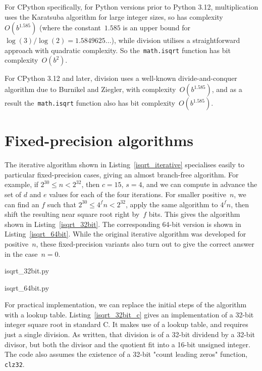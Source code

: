 \documentclass[a4paper]{article}
\theoremstyle{plain}
\theoremstyle{definition}
\begin{document}
For CPython specifically, for Python versions prior to Python 3.12,
multiplication uses the Karatsuba algorithm for large integer sizes, so has
complexity~$O(b^{1.585})$ (where the constant~$1.585$ is an upper bound
for~$\log(3)/\log(2) = 1.5849625...$), while division utilises a
straightforward approach with quadratic complexity. So
the~\lstinline$math.isqrt$ function has bit complexity~$O(b^2)$.

For CPython 3.12 and later, division uses a well-known divide-and-conquer
algorithm due to Burnikel and Ziegler, with complexity~$O(b^{1.585})$, and as a
result the~\lstinline$math.isqrt$ function also has bit
complexity~$O(b^{1.585})$.

\section{Fixed-precision algorithms}

The iterative algorithm shown in Listing~\ref{isqrt_iterative} specialises
easily to particular fixed-precision cases, giving an almost branch-free
algorithm. For example, if $2^{30} \le n < 2^{32}$, then $c = 15$, $s=4$, and
we can compute in advance the set of $d$ and $e$ values for each of the four
iterations. For smaller positive~$n$, we can find an $f$ such that $2^{30} \le
4^f n < 2^{32}$, apply the same algorithm to $4^f n$, then shift the resulting
near square root right by~$f$ bits. This gives the algorithm shown in
Listing~\ref{isqrt_32bit}. The corresponding 64-bit version is shown in
Listing~\ref{isqrt_64bit}. While the original iterative algorithm was developed for
positive~$n$, these fixed-precision variants also turn out to give the correct
answer in the case~$n = 0$.


  {isqrt_32bit.py}


  {isqrt_64bit.py}

For practical implementation, we can replace the initial steps of the algorithm
with a lookup table. Listing~\ref{isqrt_32bit_c} gives an implementation of a
32-bit integer square root in standard C. It makes use of a lookup table, and
requires just a single division. As written, that division is of a 32-bit
dividend by a 32-bit divisor, but both the divisor and the quotient fit into a
16-bit unsigned integer. The code also assumes the existence of a 32-bit "count
leading zeros" function, \lstinline$clz32$.
\end{document}
